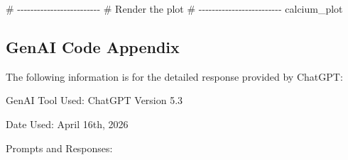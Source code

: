 \documentclass[
  letterpaper,
  DIV=11,
  numbers=noendperiod]{scrartcl}
\newenvironment{Shaded}{\begin{snugshade}}{\end{snugshade}}
\newcommand{\CommentTok}[1]{\textcolor[rgb]{0.37,0.37,0.37}{#1}}
\newcommand{\NormalTok}[1]{\textcolor[rgb]{0.00,0.23,0.31}{#1}}
\begin{document}
\begin{Shaded}
\begin{Highlighting}[]
\CommentTok{\# {-}{-}{-}{-}{-}{-}{-}{-}{-}{-}{-}{-}{-}{-}{-}{-}{-}{-}{-}{-}{-}{-}{-}{-}{-}}
\CommentTok{\# Render the plot}
\CommentTok{\# {-}{-}{-}{-}{-}{-}{-}{-}{-}{-}{-}{-}{-}{-}{-}{-}{-}{-}{-}{-}{-}{-}{-}{-}{-}}
\NormalTok{calcium\_plot}
\end{Highlighting}
\end{Shaded}

\subsection{GenAI Code Appendix}\label{genai-code-appendix}

The following information is for the detailed response provided by
ChatGPT:

GenAI Tool Used: ChatGPT Version 5.3

Date Used: April 16th, 2026

Prompts and Responses:
\end{document}
